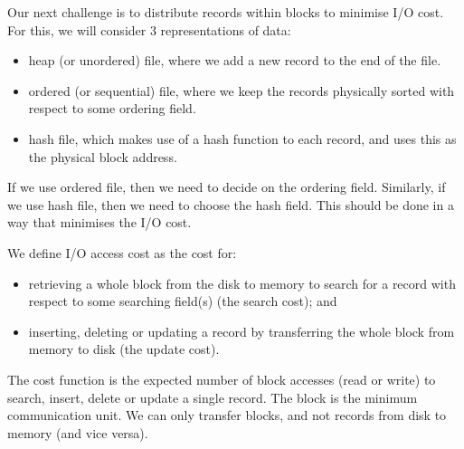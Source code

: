 \documentclass[a4paper, openany]{memoir}
\begin{document}

Our next challenge is to distribute records within blocks to minimise I/O cost. For this, we will consider 3 representations of data:
\begin{itemize}
    \item heap (or unordered) file, where we add a new record to the end of the file.
    \item ordered (or sequential) file, where we keep the records physically sorted with respect to some ordering field.
    \item hash file, which makes use of a hash function to each record, and uses this as the physical block address.
\end{itemize}
If we use ordered file, then we need to decide on the ordering field. Similarly, if we use hash file, then we need to choose the hash field. This should be done in a way that minimises the I/O cost.

We define I/O access cost as the cost for:
\begin{itemize}
    \item retrieving a whole block from the disk to memory to search for a record with respect to some searching field(s) (the search cost); and
    \item inserting, deleting or updating a record by transferring the whole block from memory to disk (the update cost).
\end{itemize}
The cost function is the expected number of block accesses (read or write) to search, insert, delete or update a single record. The block is the minimum communication unit. We can only transfer blocks, and not records from disk to memory (and vice versa).
\end{document}
